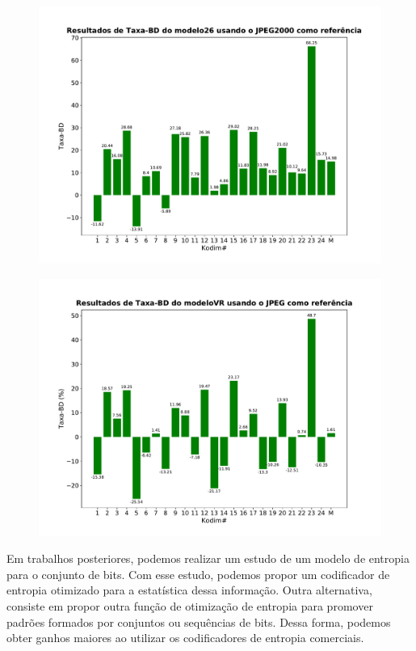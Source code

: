 \begin{figure}
	\centering
	\includegraphics[width=1.0\textwidth]{figuras/bd-rate_ref_JPEG2k.pdf}
	\caption{}  	
	\label{fig:comp_jp2k}
\end{figure}



\begin{figure}
	\centering
	\includegraphics[width=1.0\textwidth]{figuras/bd-rate_ref_JPEG.pdf}
	\caption{}  	
	\label{fig:comp_jp}
\end{figure}


 Em trabalhos posteriores, podemos realizar um estudo de um modelo de entropia para o conjunto de bits. Com esse estudo, podemos propor um codificador de entropia otimizado para a estatística dessa informação. 
Outra alternativa, consiste em propor outra função de otimização de entropia para promover padrões formados por conjuntos ou sequências de bits. Dessa forma, podemos obter ganhos maiores ao utilizar os codificadores de entropia comerciais.
